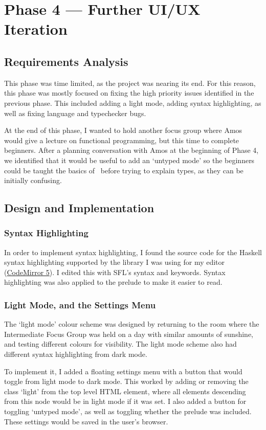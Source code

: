 \chapter{Phase 4 --- Further UI/UX Iteration}
\section{Requirements Analysis}
This phase was time limited, as the project was nearing its end. For this reason, this phase was mostly focused on fixing the high priority issues identified in the previous phase. This included adding a light mode, adding syntax highlighting, as well as fixing language and typechecker bugs. 

At the end of this phase, I wanted to hold another focus group where Amos would give a lecture on functional programming, but this time to complete beginners. After a planning conversation with Amos at the beginning of Phase 4, we identified that it would be useful to add an `untyped mode' so the beginners could be taught the basics of \lcalc\ before trying to explain types, as they can be initially confusing. 

\section{Design and Implementation}
\subsection{Syntax Highlighting}
In order to implement syntax highlighting, I found the source code for the Haskell syntax highlighting supported by the library I was using for my editor (\href{https://codemirror.net/5/}{CodeMirror 5}). I edited this with SFL's syntax and keywords. Syntax highlighting was also applied to the prelude to make it easier to read. 

\subsection{Light Mode, and the Settings Menu}
The `light mode' colour scheme was designed by returning to the room where the Intermediate Focus Group was held on a day with similar amounts of sunshine, and testing different colours for visibility. The light mode scheme also had different syntax highlighting from dark mode. 

To implement it, I added a floating settings menu with a button that would toggle from light mode to dark mode. This worked by adding or removing the class `light' from the top level HTML element, where all elements descending from this node would be in light mode if it was set. I also added a button for toggling `untyped mode', as well as toggling whether the prelude was included. These settings would be saved in the user's browser.

